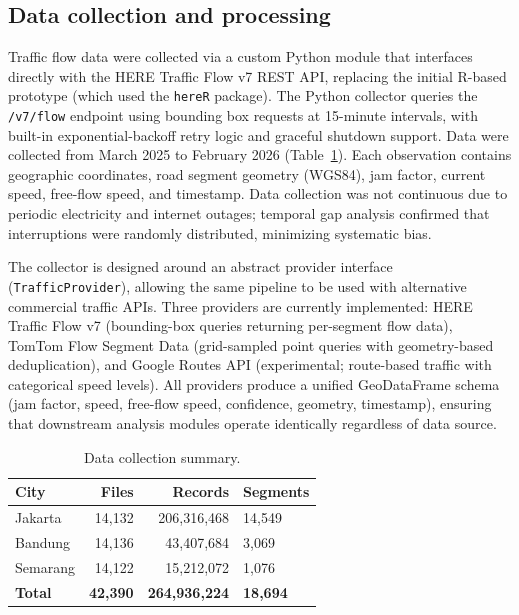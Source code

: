 \documentclass[preprint,12pt,authoryear]{elsarticle}
\begin{document}
\subsection{Data collection and processing}

Traffic flow data were collected via a custom Python module that interfaces directly with the HERE Traffic Flow v7 REST API, replacing the initial R-based prototype (which used the \texttt{hereR} package). The Python collector queries the \texttt{/v7/flow} endpoint using bounding box requests at 15-minute intervals, with built-in exponential-backoff retry logic and graceful shutdown support. Data were collected from March 2025 to February 2026 (Table~\ref{tab:datacollection}). Each observation contains geographic coordinates, road segment geometry (WGS84), jam factor, current speed, free-flow speed, and timestamp. Data collection was not continuous due to periodic electricity and internet outages; temporal gap analysis confirmed that interruptions were randomly distributed, minimizing systematic bias.

The collector is designed around an abstract provider interface (\texttt{TrafficProvider}), allowing the same pipeline to be used with alternative commercial traffic APIs. Three providers are currently implemented: HERE Traffic Flow v7 (bounding-box queries returning per-segment flow data), TomTom Flow Segment Data (grid-sampled point queries with geometry-based deduplication), and Google Routes API (experimental; route-based traffic with categorical speed levels). All providers produce a unified GeoDataFrame schema (jam factor, speed, free-flow speed, confidence, geometry, timestamp), ensuring that downstream analysis modules operate identically regardless of data source.

\begin{table}[htbp]
\centering
\caption{Data collection summary.}
\label{tab:datacollection}
\begin{tabular}{lrrl}
\toprule
City & Files & Records & Segments \\
\midrule
Jakarta  & 14,132 & 206,316,468 & 14,549 \\
Bandung  & 14,136 & 43,407,684  & 3,069 \\
Semarang & 14,122 & 15,212,072  & 1,076 \\
\textbf{Total} & \textbf{42,390} & \textbf{264,936,224} & \textbf{18,694} \\
\bottomrule
\end{tabular}
\end{table}
\end{document}
